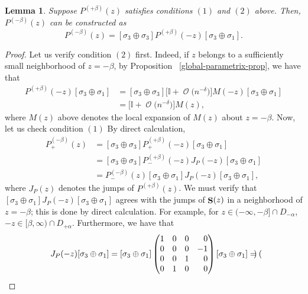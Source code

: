 \documentclass[10pt,a4paper]{amsart}
\DeclareMathOperator{\OO}{\mathcal{O}}
\DeclareMathOperator{\boldS}{{\bf S}}
\numberwithin{equation}{section}
\newtheorem{Lemma}[Theorem]{Lemma}
\begin{document}
\begin{Lemma}\label{Parametrix-symmetry-prop}
 Suppose $P^{(+\beta)}(z)$ satisfies conditions $(1)$ and $(2)$ above. Then, $P^{(-\beta)}(z)$ can be constructed as
 \begin{equation*}
 P^{(-\beta)}(z) = [\sigma_3\oplus \sigma_3]P^{(+\beta)}(-z)[\sigma_3 \oplus \sigma_1].
 \end{equation*}
\end{Lemma}
\begin{proof}
 Let us verify condition $(2)$ first. Indeed, if $z$ belongs to a sufficiently small neighborhood of $z = -\beta$, by Proposition
~\ref{global-parametrix-prop}, we have that
 \begin{align*}
 [\sigma_3\oplus \sigma_3]P^{(+\beta)}(-z)[\sigma_3 \oplus \sigma_1] &= [\sigma_3\oplus \sigma_3]\bigl[\mathbb{I} + \OO\bigl(n^{-\delta}\bigr)\bigr] M(-z)[\sigma_3 \oplus \sigma_1]\\
 &=\bigl[\mathbb{I} + \OO\bigl(n^{-\delta}\bigr)\bigr]M(z),
 \end{align*}
 where $M(z)$ above denotes the local expansion of $M(z)$ about $z=-\beta$. Now, let us check condition $(1)$ By direct calculation,
 \begin{align*}
 P^{(-\beta)}_{+}(z) &= [\sigma_3\oplus \sigma_3]P^{(+\beta)}_{+}(-z)[\sigma_3 \oplus \sigma_1]\\
 &= [\sigma_3\oplus \sigma_3]P^{(+\beta)}_{-}(-z) J_{P}(-z)[\sigma_3 \oplus \sigma_1]\\
 &= P^{(-\beta)}_-(z) [\sigma_3 \oplus \sigma_1] J_{P}(-z)[\sigma_3 \oplus \sigma_1],
 \end{align*}
 where $J_P(z)$ denotes the jumps of $P^{(+\beta)}(z)$. We must verify that $[\sigma_3 \oplus \sigma_1]J_{P}(-z)[\sigma_3 \oplus \sigma_1]$ agrees with the
 jumps of $\boldS(z)$ in a neighborhood of $z=-\beta$; this is done by direct calculation. For example, for $z \in (-\infty,-\beta]\cap D_{-\alpha}$,
 $-z \in [\beta,\infty) \cap D_{+\alpha}$. Furthermore, we have that
 \begin{equation*}
 [\sigma_3 \oplus \sigma_1]J_{P}(-z)[\sigma_3 \oplus \sigma_1] = [\sigma_3 \oplus \sigma_1]
 \begin{pmatrix}
 1 & 0 & 0 & \hphantom{-} 0\\
 0 & 0 & 0 & -1\\
 0 & 0 & 1 & \hphantom{-} 0\\
 0 & 1 & 0 & \hphantom{-} 0
 \end{pmatrix}[\sigma_3 \oplus \sigma_1] =
 \begin{pmatrix}

\end{pmatrix}
\end{equation*}
\end{proof}
\end{document}

